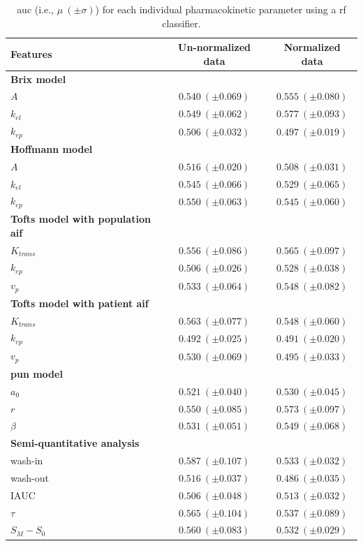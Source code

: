 \begin{table}
  \caption{\acs*{auc} (i.e., $\mu \ (\pm \sigma)$) for each individual pharmacokinetic parameter using a \acs*{rf} classifier.}
  \centering
  \scriptsize
  \begin{tabular}{lcc}
    \toprule
    \textbf{Features} & \textbf{Un-normalized data} & \textbf{Normalized data} \\
    \midrule
    \textbf{Brix model} & & \\
    \quad $A$         & $0.540\ (\pm 0.069)$ & $0.555\ (\pm 0.080)$ \\
    \quad $k_{el}$    & $0.549\ (\pm 0.062)$ & $0.577\ (\pm 0.093)$ \\
    \quad $k_{ep}$    & $0.506\ (\pm 0.032)$ & $0.497\ (\pm 0.019)$ \\
    \textbf{Hoffmann model} & & \\
    \quad $A$         & $0.516\ (\pm 0.020)$ & $0.508\ (\pm 0.031)$ \\
    \quad $k_{el}$    & $0.545\ (\pm 0.066)$ & $0.529\ (\pm 0.065)$ \\
    \quad $k_{ep}$    & $0.550\ (\pm 0.063)$ & $0.545\ (\pm 0.060)$ \\
    \textbf{Tofts model with population \acs*{aif}} & & \\
    \quad $K_{trans}$ & $0.556\ (\pm 0.086)$ & $0.565\ (\pm 0.097)$ \\
    \quad $k_{ep}$    & $0.506\ (\pm 0.026)$ & $0.528\ (\pm 0.038)$ \\
    \quad $v_{p}$     & $0.533\ (\pm 0.064)$ & $0.548\ (\pm 0.082)$ \\
    \textbf{Tofts model with patient \acs*{aif}} & & \\
    \quad $K_{trans}$ & $0.563\ (\pm 0.077)$ & $0.548\ (\pm 0.060)$ \\
    \quad $k_{ep}$    & $0.492\ (\pm 0.025)$ & $0.491\ (\pm 0.020)$ \\
    \quad $v_{p}$     & $0.530\ (\pm 0.069)$ & $0.495\ (\pm 0.033)$ \\
    \textbf{\acs*{pun} model} & & \\
    \quad $a_0$       & $0.521\ (\pm 0.040)$ & $0.530\ (\pm 0.045)$ \\
    \quad $r$         & $0.550\ (\pm 0.085)$ & $0.573\ (\pm 0.097)$ \\
    \quad $\beta$     & $0.531\ (\pm 0.051)$ & $0.549\ (\pm 0.068)$ \\
    \textbf{Semi-quantitative analysis} & & \\
    \quad wash-in     & $0.587\ (\pm 0.107)$ & $0.533\ (\pm 0.032)$ \\
    \quad wash-out    & $0.516\ (\pm 0.037)$ & $0.486\ (\pm 0.035)$ \\
    \quad IAUC        & $0.506\ (\pm 0.048)$ & $0.513\ (\pm 0.032)$ \\
    \quad $\tau$      & $0.565\ (\pm 0.104)$ & $0.537\ (\pm 0.089)$ \\
    \quad $S_M - S_0$ & $0.560\ (\pm 0.083)$ & $0.532\ (\pm 0.029)$ \\
    \bottomrule
  \end{tabular}
  \label{tab:resfeats}
\end{table}

